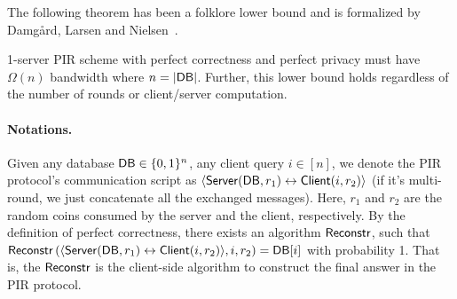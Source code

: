 The following theorem has been a folklore lower bound and is formalized by Damg\r{a}rd, Larsen and Nielsen~\cite{DLN19}.

\begin{theorem}
1-server PIR scheme with perfect correctness and perfect privacy must have $\Omega(n)$ bandwidth where $n = |{\sf DB}|$. Further, this lower bound holds
regardless of the number of rounds or client/server computation.
\end{theorem}


\paragraph{Notations.} Given any database ${\sf DB} \in \{0, 1\}^n$, any client query $i\in[n]$,    
we denote the PIR protocol's communication script as $\langle {\sf Server}({\sf DB}, r_1) \leftrightarrow {\sf Client}(i, r_2) \rangle$ (if it's multi-round, we just concatenate all the exchanged messages).
Here, $r_1$ and $r_2$ are the random coins consumed by the server and the client, respectively.
By the definition of perfect correctness, there exists an algorithm ${\sf Reconstr}$, such that ${\sf Reconstr}\left(\langle {\sf Server}({\sf DB}, r_1) \leftrightarrow {\sf Client}(i, r_2) \rangle, i, r_2\right)={\sf DB}[i]$ with probability 1.
That is, the ${\sf Reconstr}$ is the client-side algorithm to construct the final answer in the PIR protocol.

